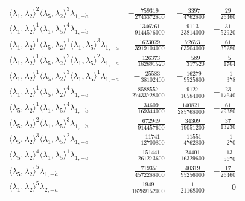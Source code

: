 \begin{longtable}{@{}lrrr@{}}
$\langle\lambda_1,\lambda_2\rangle^{2}\langle\lambda_5,\lambda_2\rangle^{3}\lambda_{1,+\dot a}$ & $-\frac{759319}{2743372800}$ & $-\frac{3397}{4762800}$ & $\frac{29}{26460}$ \\
$\langle\lambda_1,\lambda_2\rangle^{1}\langle\lambda_1,\lambda_5\rangle^{4}\lambda_{1,+\dot a}$ & $\frac{1346761}{9144576000}$ & $\frac{9113}{23814000}$ & $-\frac{31}{52920}$ \\
$\langle\lambda_1,\lambda_2\rangle^{1}\langle\lambda_5,\lambda_2\rangle^{1}\langle\lambda_1,\lambda_5\rangle^{3}\lambda_{1,+\dot a}$ & $-\frac{1623029}{3919104000}$ & $-\frac{72673}{63504000}$ & $\frac{61}{35280}$ \\
$\langle\lambda_1,\lambda_2\rangle^{1}\langle\lambda_5,\lambda_2\rangle^{2}\langle\lambda_1,\lambda_5\rangle^{2}\lambda_{1,+\dot a}$ & $\frac{126373}{182891520}$ & $\frac{589}{317520}$ & $-\frac{5}{1764}$ \\
$\langle\lambda_1,\lambda_2\rangle^{1}\langle\lambda_5,\lambda_2\rangle^{3}\langle\lambda_1,\lambda_5\rangle^{1}\lambda_{1,+\dot a}$ & $-\frac{25583}{38102400}$ & $-\frac{16279}{9525600}$ & $\frac{1}{378}$ \\
$\langle\lambda_1,\lambda_2\rangle^{1}\langle\lambda_5,\lambda_2\rangle^{4}\lambda_{1,+\dot a}$ & $\frac{8588557}{27433728000}$ & $\frac{9127}{10584000}$ & $-\frac{23}{17640}$ \\
$\langle\lambda_5,\lambda_2\rangle^{1}\langle\lambda_1,\lambda_5\rangle^{4}\lambda_{1,+\dot a}$ & $\frac{34609}{169344000}$ & $\frac{140821}{285768000}$ & $-\frac{61}{79380}$ \\
$\langle\lambda_5,\lambda_2\rangle^{2}\langle\lambda_1,\lambda_5\rangle^{3}\lambda_{1,+\dot a}$ & $-\frac{672949}{914457600}$ & $-\frac{34309}{19051200}$ & $\frac{37}{13230}$ \\
$\langle\lambda_5,\lambda_2\rangle^{3}\langle\lambda_1,\lambda_5\rangle^{2}\lambda_{1,+\dot a}$ & $\frac{11741}{12700800}$ & $\frac{11551}{4762800}$ & $-\frac{1}{270}$ \\
$\langle\lambda_5,\lambda_2\rangle^{4}\langle\lambda_1,\lambda_5\rangle^{1}\lambda_{1,+\dot a}$ & $-\frac{151441}{261273600}$ & $-\frac{24401}{16329600}$ & $\frac{13}{5670}$ \\
$\langle\lambda_5,\lambda_2\rangle^{5}\lambda_{1,+\dot a}$ & $\frac{719351}{4572288000}$ & $\frac{40319}{95256000}$ & $-\frac{17}{26460}$ \\
$\langle\lambda_1,\lambda_2\rangle^{5}\lambda_{2,+\dot a}$ & $\frac{1949}{18289152000}$ & $-\frac{1}{21168000}$ & $0$ \\

\end{longtable}
